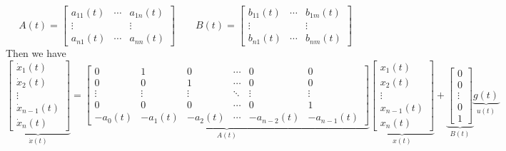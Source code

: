 \documentclass[twoside]{article}
\begin{document}
\begin{remark}
    \[
    A(t) = \begin{bmatrix}
       a_{11}(t)& \cdots & a_{1n}(t)    \\[0.3em]
       \vdots   &        & \vdots       \\[0.3em]
       a_{n1}(t)& \cdots & a_{nn}(t)    
     \end{bmatrix}
     \qquad
    B(t) = \begin{bmatrix}
       b_{11}(t)& \cdots & b_{1m}(t)    \\[0.3em]
       \vdots   &        & \vdots       \\[0.3em]
       b_{n1}(t)& \cdots & b_{nm}(t)    
     \end{bmatrix}
    \]
    Then we have
    \begin{equation}
    \underbrace{\begin{bmatrix}
            \dot{x}_1(t) \\[0.3em]
            \dot{x}_2(t) \\[0.3em]
            \vdots \\[0.3em]
            \dot{x}_{n-1}(t) \\[0.3em]
            \dot{x}_n(t)      
         \end{bmatrix}}_{\dot{x}(t)} 
    = \underbrace{\begin{bmatrix}
            0 & 1& 0& \cdots   & 0 & 0   \\[0.3em]
            0 & 0& 1& \cdots   & 0 & 0   \\[0.3em]
            \vdots & \vdots   & \vdots   &   \ddots     & \vdots& \vdots       \\[0.3em]
            0 & 0& 0& \cdots   & 0 & 1   \\[0.3em]
            -a_0(t) & -a_{1}(t)& -a_{2}(t)& \cdots & -a_{n-2}(t)& -a_{n-1}(t)    
          \end{bmatrix}}_{A(t)}
    \underbrace{\begin{bmatrix}
            x_1(t) \\[0.3em]
            x_2(t) \\[0.3em]
            \vdots \\[0.3em]
            x_{n-1}(t) \\[0.3em]
            x_n(t)      
         \end{bmatrix}}_{x(t)} + 
    \underbrace{\begin{bmatrix}
            0 \\[0.3em]
            0 \\[0.3em]
            \vdots \\[0.3em]
            0 \\[0.3em]
            1         
        \end{bmatrix} }_{B(t)} \underbrace{g(t)}_{u(t)}
    \end{equation}
\end{remark}
\end{document}
